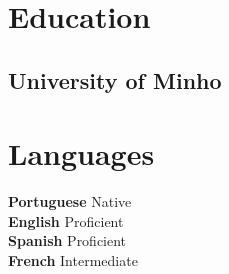 \documentclass[]{styling}
\begin{document}
\begin{minipage}[t]{0.27\textwidth}

\section{Education}
\subsection{University of Minho}
\sectionsep


\section{Languages}
\textbf{Portuguese} Native \\
\textbf{English} Proficient \\
\textbf{Spanish} Proficient \\
\textbf{French} Intermediate
\sectionsep

\vspace{10pt}
\end{minipage}%
\hfill
\end{document}
